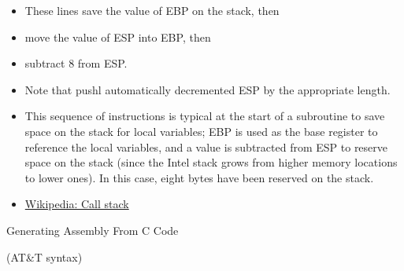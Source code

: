 \begin{itemize}
\item These lines save the value of EBP on the stack, then
\item move the value of ESP into EBP, then
\item subtract 8 from ESP.
\item Note that pushl automatically decremented ESP by the appropriate length.
\item This sequence of instructions is typical at the start of a subroutine to save space
  on the stack for local variables; EBP is used as the base register to reference the
  local variables, and a value is subtracted from ESP to reserve space on the stack (since
  the Intel stack grows from higher memory locations to lower ones). In this case, eight
  bytes have been reserved on the stack.
\item \href{http://en.wikipedia.org/wiki/Call_stack}{Wikipedia: Call stack}
\end{itemize}

\begin{frame}{Generating Assembly From C Code}
  \begin{minipage}{.32\linewidth}
      \begin{block}{}
         
      \end{block}
      \begin{center}
      \end{center}
  \end{minipage}\qquad
  \begin{minipage}{.59\linewidth}
      \begin{block}{ \scriptsize{(AT\&T syntax)}}
      \end{block}    
  \end{minipage}
\end{frame}

